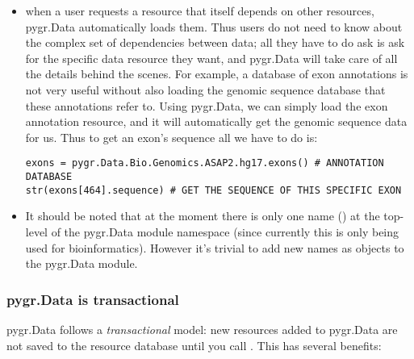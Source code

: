 \documentclass{howto}
\begin{document}
\begin{itemize}
\item when a user requests a resource that itself depends on other
resources, pygr.Data automatically loads them.  Thus users do not need
to know about the complex set of dependencies between data; all they
have to do ask is ask for the specific data resource they want,
and pygr.Data will take care of all the details behind the scenes.
For example, a database of exon annotations is not very useful without
also loading the genomic sequence database that these annotations
refer to.  Using pygr.Data, we can simply load the exon annotation
resource, and it will automatically get the genomic sequence data
for us.  Thus to get an exon's sequence all we have to do is:
\begin{verbatim}
exons = pygr.Data.Bio.Genomics.ASAP2.hg17.exons() # ANNOTATION DATABASE
str(exons[464].sequence) # GET THE SEQUENCE OF THIS SPECIFIC EXON
\end{verbatim}

\item It should be noted that at the moment there is only one name
() at the top-level of the pygr.Data module namespace (since currently
this is only being used for bioinformatics).  However it's 
trivial to add new names as  objects to the pygr.Data
module.

\end{itemize}

\subsubsection{pygr.Data is transactional}

pygr.Data follows a {\em transactional} model: new resources
added to pygr.Data are not saved to the resource database until you
call .  This has several benefits:
\end{document}
